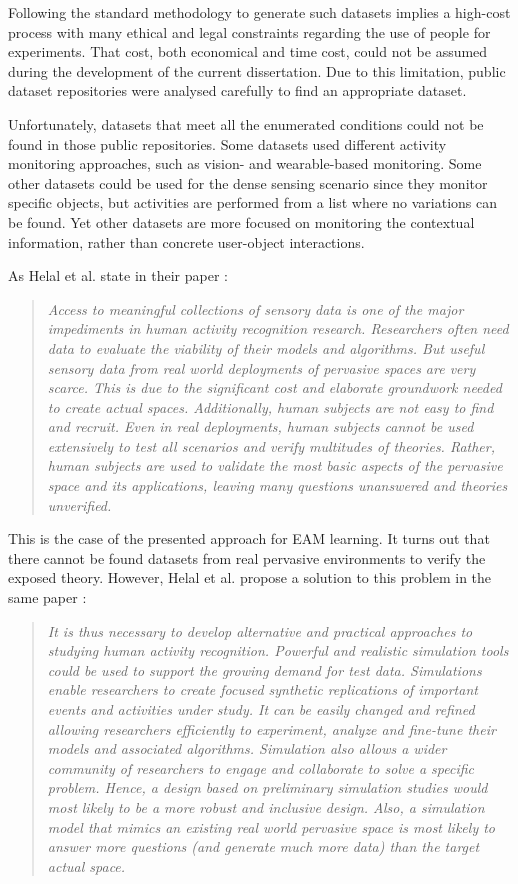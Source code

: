 Following the standard methodology to generate such datasets implies a high-cost process with many ethical and legal constraints regarding the use of people for experiments. That cost, both economical and time cost, could not be assumed during the development of the current dissertation. Due to this limitation, public dataset repositories were analysed carefully to find an appropriate dataset.

Unfortunately, datasets that meet all the enumerated conditions could not be found in those public repositories. Some datasets used different activity monitoring approaches, such as vision- and wearable-based monitoring. Some other datasets could be used for the dense sensing scenario since they monitor specific objects, but activities are performed from a list where no variations can be found. Yet other datasets are more focused on monitoring the contextual information, rather than concrete user-object interactions.

As Helal et al. state in their paper \cite{Helal2011}:

\blockquote{\textit{Access to meaningful collections of sensory data is one of the major impediments in human activity recognition research. Researchers often need data to evaluate the viability of their models and algorithms. But useful sensory data from real world deployments of pervasive spaces are very scarce. This is due to the significant cost and elaborate groundwork needed to create actual spaces. Additionally, human subjects are not easy to find and recruit. Even in real deployments, human subjects cannot be used extensively to test all scenarios and verify multitudes of theories. Rather, human subjects are used to validate the most basic aspects of the pervasive space and its applications, leaving many questions unanswered and theories unverified.}}

This is the case of the presented approach for EAM learning. It turns out that there cannot be found datasets from real pervasive environments to verify the exposed theory. However, Helal et al. propose a solution to this problem in the same paper \cite{Helal2011}:

\blockquote{\textit{It is thus necessary to develop alternative and practical approaches to studying human activity recognition. Powerful and realistic simulation tools could be used to support the growing demand for test data. Simulations enable researchers to create focused synthetic replications of important events and activities under study. It can be easily changed and refined allowing researchers efficiently to experiment, analyze and fine-tune their models and associated algorithms. Simulation also allows a wider community of researchers to engage and collaborate to solve a specific problem. Hence, a design based on preliminary simulation studies would most likely to be a more robust and inclusive design. Also, a simulation model that mimics an existing real world pervasive space is most likely to answer more questions (and generate much more data) than the target actual space.}}

